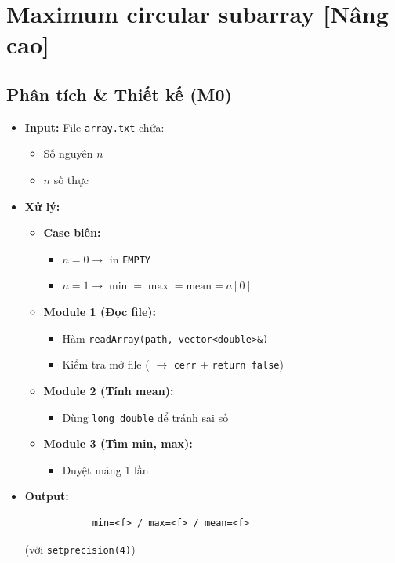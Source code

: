 \section{Maximum circular subarray [Nâng cao]}
\subsection{Phân tích \& Thiết kế (M0)}
    \begin{itemize}
    \item \textbf{Input:}
    File \texttt{array.txt} chứa:
    \begin{itemize}
        \item Số nguyên $n$
        \item $n$ số thực
    \end{itemize}

    \item \textbf{Xử lý:}
        \begin{itemize}
            \item \textbf{Case biên:}
            \begin{itemize}
                \item $n = 0 \rightarrow$ in \texttt{EMPTY}
                \item $n = 1 \rightarrow \min = \max = \text{mean} = a[0]$
            \end{itemize}
            
            \item \textbf{Module 1 (Đọc file):}
            \begin{itemize}
                \item Hàm \texttt{readArray(path, vector<double>\&)}
                \item Kiểm tra mở file ( $\rightarrow$ \texttt{cerr} + \texttt{return false})
            \end{itemize}
            
            \item \textbf{Module 2 (Tính mean):}
            \begin{itemize}
                \item Dùng \texttt{long double} để tránh sai số
            \end{itemize}
            
            \item \textbf{Module 3 (Tìm min, max):}
            \begin{itemize}
                \item Duyệt mảng 1 lần
            \end{itemize}
        \end{itemize}

        \item \textbf{Output:}
        \begin{lstlisting}
            min=<f> / max=<f> / mean=<f>\end{lstlisting} 
        (với \texttt{setprecision(4)})
    \end{itemize}

